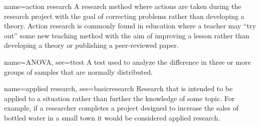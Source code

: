 







{name={action research}}
{%
	A research method where actions are taken during the research project with the goal of correcting problems rather than developing a theory. Action research is commonly found in education where a teacher may ``try out'' some new teaching method with the aim of improving a lesson rather than developing a theory or publishing a peer-reviewed paper.
}

{name={ANOVA},
	see={ttest}}
{%
	A test used to analyze the difference in three or more groups of samples that are normally distributed.
}

{name={applied research},
 see={basicresearch}}
{%
	Research that is intended to be applied to a situation rather than further the knowledge of some topic. For example, if a researcher completes a project designed to increase the sales of bottled water in a small town it would be considered applied research.
}

